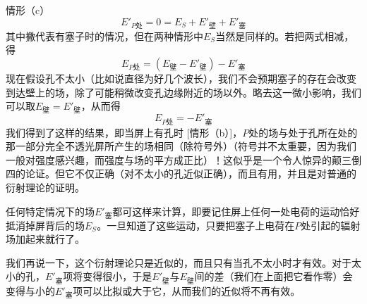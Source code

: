 情形（c）
\begin{equation*}
    E'_{P\text{处}}=0=E_S+E'_\text{壁}+E'_\text{塞}
\end{equation*}
其中撇代表有塞子时的情况，但在两种情形中$E_S$当然是同样的。若把两式相减，得
\begin{equation*}
    E_{P\text{处}}=(E_\text{壁} - E'_\text{壁})-E'_\text{塞}
\end{equation*}
现在假设孔不太小（比如说直径为好几个波长），我们不会预期塞子的存在会改变到达壁上的场，除了可能稍微改变孔边缘附近的场以外。略去这一微小影响，我们可以取$E_\text{壁}=E'_\text{壁}$，从而得
\begin{equation*}
    E_{P\text{处}}=-E'_\text{塞}
\end{equation*}
我们得到了这样的结果，即当屏上有孔时 [情形（b）]，$P$处的场与处于孔所在处的那一部分完全不透光屏所产生的场相同（除符号外）（符号并不太重要，因为我们一般对强度感兴趣，而强度与场的平方成正比）！这似乎是一个令人惊异的颠三倒四的论证。但它不仅正确（对不太小的孔近似正确），而且有用，并且是对普通的衍射理论的证明。

任何特定情况下的场$E'_\text{塞}$都可这样来计算，即要记住屏上任何一处电荷的运动恰好抵消掉屏背后的场$E_S$。一旦知道了这些运动，只要把塞子上电荷在$P$处引起的辐射场加起来就行了。

我们再说一下，这个衍射理论只是近似的，而且只有当孔不太小时才有效。对于太小的孔，$E'_\text{塞}$项将变得很小，于是$E'_\text{壁}$与$E_\text{壁}$间的差（我们在上面把它看作零）会变得与小的$E'_\text{塞}$项可以比拟或大于它，从而我们的近似将不再有效。